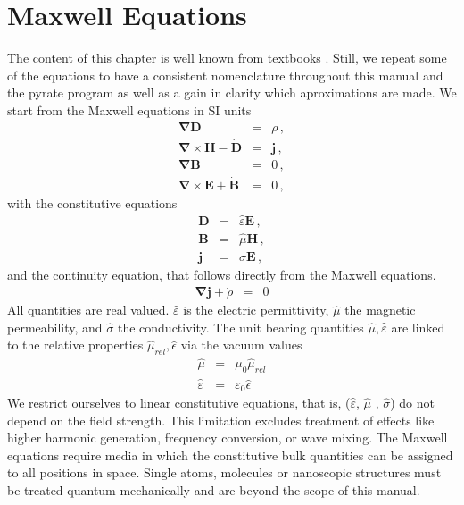 \documentclass[12pt,a4paper,twoside,openright,BCOR10mm,headsepline,titlepage,abstracton,chapterprefix,final]{scrreprt}
\newcommand\Vector[1]{{\mathbf{#1}}}
\newcommand\vacuum{0}
\newcommand\Nabla{\Vector{\nabla}}
\newcommand\timederivative[1]{\dot{{#1}}}
\newcommand\Tensor[1]{\hat{#1}}
\newcommand\scalarEfield{E}
\newcommand\scalarBfield{B}
\newcommand\scalarHfield{H}
\newcommand\scalarDfield{D}
\newcommand\Efield{\Vector{\scalarEfield}}
\newcommand\Bfield{\Vector{\scalarBfield}}
\newcommand\Hfield{\Vector{\scalarHfield}}
\newcommand\Dfield{\Vector{\scalarDfield}}
\newcommand\permeability{\Tensor{\scalarpermeability}}
\newcommand\vacuumpermeability{\scalarpermeability_{\vacuum}}
\newcommand\scalarpermeability{\mu}
\newcommand\relativepermeability{\Tensor{\mu}_{rel}}
\newcommand\permittivity{\Tensor{\scalarpermittivity}}
\newcommand\vacuumpermittivity{\scalarpermittivity_{\vacuum}}
\newcommand\scalarrelativepermittivity{\epsilon}
\newcommand\relativepermittivity{\Tensor{\scalarrelativepermittivity}}
\newcommand\scalarpermittivity{\varepsilon}
\newcommand\conductivity{\Tensor{\sigma}}
\newcommand\currentdensity{\Vector{j}}
\newcommand\chargedensity{\rho}
\begin{document}
\section{Maxwell Equations}
The content of this chapter is well known from textbooks \cite{Jackson, BornWolf}. Still, we repeat some of the equations to have a consistent 
nomenclature throughout this manual and the pyrate program as well as a gain in clarity which aproximations are made.
We start from the Maxwell equations in SI units
\begin{subequations}\label{eq:Maxwell}
\begin{eqnarray}
  \Nabla \Dfield &=& \chargedensity\,, 							\label{eq:MaxwellNablaD}\\
  \Nabla \times \Hfield -\timederivative{\Dfield} &=&  \currentdensity\,,  		\label{eq:MaxwellNablaCrossH} \\
  \Nabla \Bfield &=& 0\,,  									\label{eq:MaxwellNablaB} \\
  \Nabla \times \Efield + \timederivative{\Bfield} &=& 0\,,   					\label{eq:MaxwellNablaCrossE}
\end{eqnarray}
\end{subequations}
with the constitutive equations
\begin{subequations}\label{eq:Material}
\begin{eqnarray}
  \Dfield &=& \permittivity \Efield\,, 								\label{eq:ConstitutiveEpsilon}\\
  \Bfield &=& \permeability \Hfield\,, 								\label{eq:ConstitutiveMu}\\
  \currentdensity &=& \conductivity \Efield\,,						\label{eq:ConstitutiveSigma}
\end{eqnarray}
\end{subequations}
and the continuity equation, that follows directly from the Maxwell equations.
\begin{eqnarray}
  \Nabla \currentdensity + \timederivative{\chargedensity} &=& 0		\label{eq:continuity}
\end{eqnarray}
All quantities are real valued. $\permittivity$ is the  electric  permittivity, 
$\permeability$ the magnetic permeability, 
and $\conductivity$ the conductivity.
The unit bearing quantities $\permeability, \permittivity$ 
are linked to the relative properties $\relativepermeability, \relativepermittivity$ via
the vacuum values
\begin{eqnarray}
 \permeability &=& \vacuumpermeability \relativepermeability \\
 \permittivity &=& \vacuumpermittivity \relativepermittivity
\end{eqnarray}
We restrict ourselves to linear constitutive equations, that is, ($\permittivity$, $\permeability$ , $\conductivity$) do not depend on the field strength.
This limitation excludes treatment of effects like higher harmonic generation, frequency conversion, or wave mixing.
The Maxwell equations require media in which the constitutive bulk quantities can be assigned to all positions in space.
Single atoms, molecules or nanoscopic structures must be treated quantum-mechanically and are beyond the scope of this manual.
\end{document}

